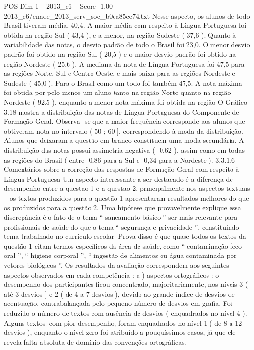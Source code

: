 \begin{textsample}{POS Dim 1 – 2013\_c6 – Score -1.00 – 2013\_c6/enade\_2013\_serv\_soc\_b0ca85ce74.txt}
Nesse aspecto, os alunos de todo Brasil tiveram média, 40,4.
A maior média com respeito à Língua Portuguesa foi obtida na região Sul ( 43,4 ), e a menor, na região Sudeste ( 37,6 ).
Quanto à variabilidade das notas, o desvio padrão de todo o Brasil foi 23,0.
O menor desvio padrão foi obtido na região Sul ( 20,5 ) e o maior desvio padrão foi obtido na região Nordeste ( 25,6 ).
A mediana da nota de Língua Portuguesa foi 47,5 para as regiões Norte, Sul e Centro-Oeste, e mais baixa para as regiões Nordeste e Sudeste ( 45,0 ).
Para o Brasil como um todo foi também 47,5.
A nota máxima foi obtida por pelo menos um aluno tanto na região Norte quanto na região Nordeste ( 92,5 ), enquanto a menor nota máxima foi obtida na região O Gráfico 3.18 mostra a distribuição das notas de Língua Portuguesa do Componente de Formação Geral.
Observa -se que a maior frequência corresponde aos alunos que obtiveram nota no intervalo ( 50 ; 60 ], correspondendo à moda da distribuição.
Alunos que deixaram a questão em branco constituem uma moda secundária.
A distribuição das notas possui assimetria negativa ( -0,62 ), assim como em todas as regiões do Brasil ( entre -0,86 para a Sul e -0,34 para a Nordeste ). 3.3.1.6 Comentários sobre a correção das respostas de Formação Geral com respeito à Língua Portuguesa Um aspecto interessante a ser destacado é a diferença de desempenho entre a questão 1 e a questão 2, principalmente nos aspectos textuais – os textos produzidos para a questão 1 apresentaram resultados melhores do que os produzidos para a questão 2.
Uma hipótese que provavelmente explique essa discrepância é o fato de o tema “ saneamento básico ” ser mais relevante para profissionais de saúde do que o tema “ segurança e privacidade ”, constituindo tema trabalhado no currículo escolar.
Prova disso é que quase todos os textos da questão 1 citam termos específicos da área de saúde, como “ contaminação feco-oral ”, “ higiene corporal ”, “ ingestão de alimentos ou água contaminada por vetores biológicos ”.
Os resultados da avaliação correspondem aos seguintes aspectos observados em cada competência : a ) aspectos ortográficos : o desempenho dos participantes ficou concentrado, majoritariamente, nos níveis 3 ( até 3 desvios ) e 2 ( de 4 a 7 desvios ), devido ao grande índice de desvios de acentuação, contrabalançada pelo pequeno número de desvios em grafia.
Foi reduzido o número de textos com ausência de desvios ( enquadrados no nível 4 ).
Alguns textos, com pior desempenho, foram enquadrados no nível 1 ( de 8 a 12 desvios ), enquanto o nível zero foi atribuído a pouquíssimos casos, já que ele revela falta absoluta de domínio das convenções ortográficas.

\end{textsample}
